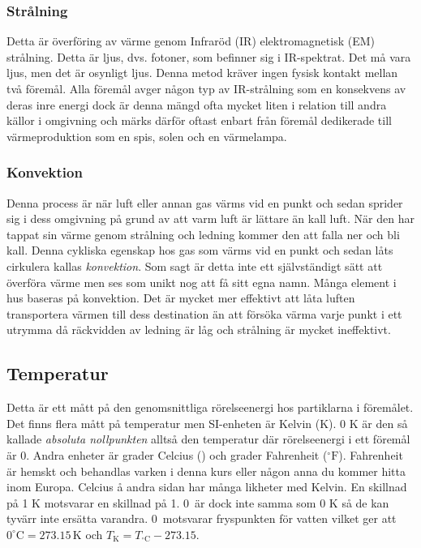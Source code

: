 \subsubsection*{Strålning}
Detta är överföring av värme genom Infraröd (IR) elektromagnetisk (EM) strålning. Detta är ljus, dvs. fotoner, som befinner sig i IR-spektrat. Det må vara ljus, men det är osynligt ljus. Denna metod kräver ingen fysisk kontakt mellan två föremål. Alla föremål avger någon typ av IR-strålning som en konsekvens av deras inre energi dock är denna mängd ofta mycket liten i relation till andra källor i omgivning och märks därför oftast enbart från föremål dedikerade till värmeproduktion som en spis, solen och en värmelampa.
\subsubsection*{Konvektion}
Denna process är när luft eller annan gas värms vid en punkt och sedan sprider sig i dess omgivning på grund av att varm luft är lättare än kall luft. När den har tappat sin värme genom strålning och ledning kommer den att falla ner och bli kall. Denna cykliska egenskap hos gas som värms vid en punkt och sedan låts cirkulera kallas \emph{konvektion}. Som sagt är detta inte ett självständigt sätt att överföra värme men ses som unikt nog att få sitt egna namn. Många element i hus baseras på konvektion. Det är mycket mer effektivt att låta luften transportera värmen till dess destination än att försöka värma varje punkt i ett utrymma då räckvidden av ledning är låg och strålning är mycket ineffektivt.

\subsection{Temperatur}
Detta är ett mått på den genomsnittliga rörelseenergi hos partiklarna i föremålet. Det finns flera mått på temperatur men SI-enheten är Kelvin (K). 0 K är den så kallade \emph{absoluta nollpunkten} alltså den temperatur där rörelseenergi i ett föremål är 0. Andra enheter är grader Celcius (\degC) och grader Fahrenheit ($\mathrm{^\circ F}$). Fahrenheit är hemskt och behandlas varken i denna kurs eller någon anna du kommer hitta inom Europa. Celcius å andra sidan har många likheter med Kelvin. En skillnad på 1 K motsvarar en skillnad på 1\degC. 0\degC\ är dock inte samma som 0 K så de kan tyvärr inte ersätta varandra. 0\degC\ motsvarar fryspunkten för vatten vilket ger att$0^\circ \mathrm{C} = 273.15\,\mathrm{K}$ och $T_{\mathrm{K}} = T_{^\circ \mathrm{C}} - 273.15$.

